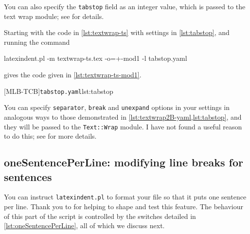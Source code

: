 \documentclass[10pt]{article}
\begin{document}
 You can also specify the \texttt{tabstop} field  as an integer value, which is passed to the text wrap module; see
 \cite{textwrap} for details.

 \begin{example}
 Starting with the code in \cref{lst:textwrap-ts} with settings in \cref{lst:tabstop},
 and running the command   %

 \begin{commandshell}
	 latexindent.pl -m textwrap-ts.tex -o=+-mod1 -l tabstop.yaml
	 \end{commandshell}

 gives the code given in \cref{lst:textwrap-ts-mod1}.
 \begin{cmhtcbraster}[raster columns=3,
   raster left skip=-3.5cm,
   raster right skip=-2cm,
   raster column skip=.03\linewidth]
  [MLB-TCB]{\texttt{tabstop.yaml}}{lst:tabstop}
 \end{cmhtcbraster}
 \end{example}

 You can specify \texttt{separator}, \texttt{break} and \texttt{unexpand} options in your
 settings in analogous ways to those demonstrated in
 \cref{lst:textwrap2B-yaml,lst:tabstop}, and they will be passed to the
 \texttt{Text::Wrap} module. I have not found a useful reason to do this; see
 \cite{textwrap} for more details.
\subsection{oneSentencePerLine: modifying line breaks for sentences}\label{sec:onesentenceperline}

 You can instruct \texttt{latexindent.pl} to format  your file so that it puts one sentence per line. Thank you to \cite{mlep} for
 helping to shape and test this feature. The behaviour of this part of the script is
 controlled by the switches detailed in \cref{lst:oneSentencePerLine}, all of which we
 discuss next. 
  
\end{document}
